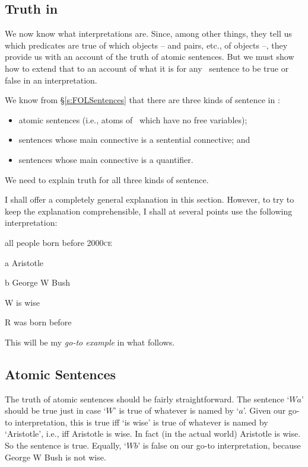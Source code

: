 \begin{earg}
\chapter{Truth in \textnormal{\FOL}}\label{s:TruthFOL}
We now know what interpretations are. Since, among other things, they tell us which predicates are true of which objects – and pairs, etc., of objects –, they provide us with an account of the truth of atomic sentences. But we must show how to extend that to an account of what it is for any \FOL\ sentence to be true or false in an interpretation. 

We know from §\ref{s:FOLSentences} that there are three kinds of sentence in \FOL: 
	\begin{itemize}
		\item atomic sentences (i.e., atoms of \FOL\ which have no free variables);
		\item sentences whose main connective is a sentential connective; and
		\item sentences whose main connective is a quantifier.
	\end{itemize}
We need to explain truth for all three kinds of sentence.

I shall offer a completely general explanation in this section. However, to try to keep the explanation comprehensible, I shall at several points use the following interpretation:
	\begin{ekey}
		\item[\domain] all people born before 2000\textsc{ce}
		\item[a] Aristotle
		\item[b] George W Bush
		\item[W]  is wise
		\item[R]  was born before 
	\end{ekey}
This will be my \emph{go-to example} in what follows. 

\section{Atomic Sentences}\label{fol.truth.atom}
The truth of atomic sentences should be fairly straightforward. The sentence `$Wa$' should be true just in case `$W$' is true of whatever is named by `$a$'. Given our go-to interpretation, this is true iff `is wise' is true of whatever is named by `Aristotle', i.e., iff Aristotle is wise. In fact (in the actual world) Aristotle is wise. So the sentence is true. Equally, `$Wb$' is false on our go-to interpretation, because George W Bush is not wise.


\end{earg}
